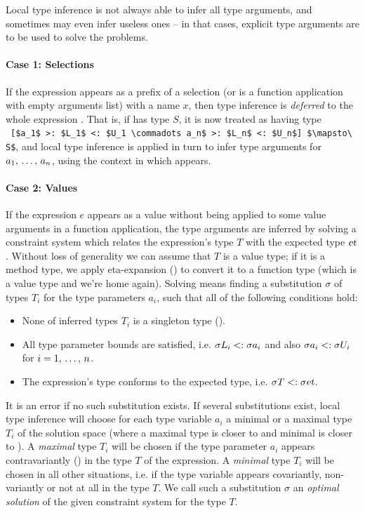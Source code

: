 Local type inference is not always able to infer all type arguments, and sometimes may even infer useless ones -- in that cases, explicit type arguments are to be used to solve the problems. 

\paragraph{Case 1: Selections}
If the expression appears as a prefix of a selection (or is a function application with empty arguments list) with a name $x$, then type inference is {\em deferred} to the whole expression . That is, if  has type $S$, it is now treated as having type ~\lstinline![$a_1$ >: $L_1$ <: $U_1 \commadots a_n$ >: $L_n$ <: $U_n$] $\mapsto\ S$!, and local type inference is applied in turn to infer type arguments for $a_1 ,\, \ldots ,\, a_n$, using the context in which  appears. 

\paragraph{Case 2: Values}
If the expression $e$ appears as a value without being applied to some value arguments in a function application, the type arguments are inferred by solving a constraint system which relates the expression's type $T$ with the expected type $\mbox{\sl et}$. Without loss of generality we can assume that $T$ is a value type; if it is a method type, we apply eta-expansion () to convert it to a function type (which is a value type and we're home again). Solving means finding a substitution $\sigma$ of types $T_i$ for the type parameters $a_i$, such that all of the following conditions hold:
\begin{itemize}
\item None of inferred types $T_i$ is a singleton type (). %
\item All type parameter bounds are satisfied, i.e. $\sigma L_i <: \sigma a_i$ and also $\sigma a_i <: \sigma U_i$ for $i = 1 ,\, \ldots ,\, n$. 
\item The expression's type conforms to the expected type, i.e. $\sigma T <: \sigma \mbox{\sl et}$. 
\end{itemize}

It is an error if no such substitution exists. If several substitutions exist, local type inference will choose for each type variable $a_i$ a minimal or a maximal type $T_i$ of the solution space (where a maximal type is closer to  and minimal is closer to ). A {\em maximal} type $T_i$ will be chosen if the type parameter $a_i$ appears contravariantly () in the type $T$ of the expression. A {\em minimal} type $T_i$ will be chosen in all other situations, i.e. if the type variable appears covariantly, non-variantly or not at all in the type $T$. We call such a substitution $\sigma$ an {\em optimal solution} of the given constraint system for the type $T$. 

